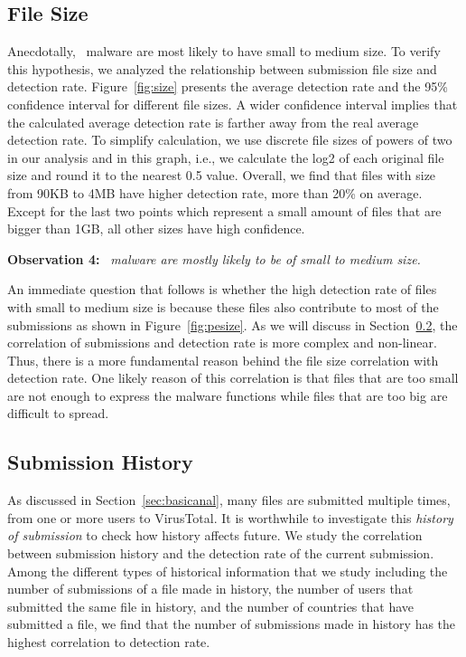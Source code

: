 \subsection{File Size}
\label{sec:size}
Anecdotally, \pe\ malware are most likely to have small to medium size. 
To verify this hypothesis, we analyzed the relationship between submission file size and detection rate. 
Figure~\ref{fig:size} presents the average detection rate and 
the 95\% confidence interval for different file sizes.
A wider confidence interval implies that
the calculated average detection rate is farther away from the real average detection rate.
To simplify calculation, we use discrete file sizes of powers of two in our analysis and in this graph,
i.e., we calculate the log2 of each original file size and round it to the nearest 0.5 value.
Overall, we find that files with size from 90KB to 4MB have higher detection rate, more than 20\% on average. 
Except for the last two points which represent a small amount of files that are bigger than 1GB, 
all other sizes have high confidence.   

{\bf Observation 4:} 
{\em \pe\ malware are mostly likely to be of small to medium size.}

An immediate question that follows is whether the high detection rate of files with small to medium size
is because these files also contribute to most of the submissions as shown in Figure~\ref{fig:pesize}.
As we will discuss in Section~\ref{sec:history}, the correlation of submissions and detection rate is more complex and non-linear.
Thus, there is a more fundamental reason behind the file size correlation with detection rate.
One likely reason of this correlation is that files that are too small are not enough to express the
malware functions while files that are too big are difficult to spread. 

\subsection{Submission History}
\label{sec:history}

%

As discussed in Section~\ref{sec:basicanal}, many files are submitted multiple times, from one or more users to VirusTotal. 
It is worthwhile to investigate this {\em history of submission} to check how history affects future.
We study the correlation between submission history and the detection rate of the current submission.
Among the different types of historical information that we study including the number of submissions of a file made in history, the number of users that submitted the same file in history, and the number of countries that have submitted a file,
we find that the number of submissions made in history has the highest correlation to detection rate.

